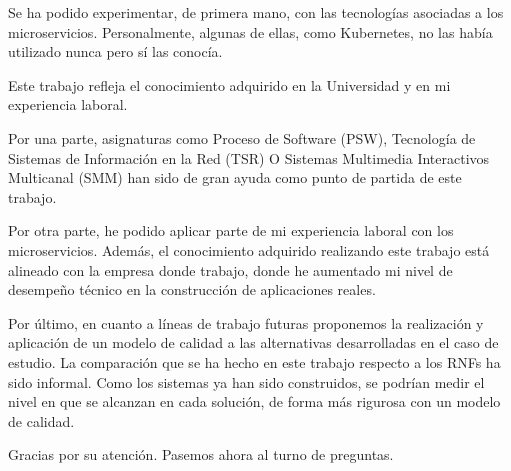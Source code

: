 \documentclass[11pt,a4paper]{article}
\begin{document}
Se ha podido experimentar, de primera mano, con las tecnologías asociadas a los microservicios. Personalmente, algunas de ellas, como Kubernetes, no las había utilizado nunca pero sí las conocía.

Este trabajo refleja el conocimiento adquirido en la Universidad y en mi experiencia laboral.

Por una parte, asignaturas como Proceso de Software (PSW), Tecnología de Sistemas de Información en la Red (TSR) O Sistemas Multimedia Interactivos Multicanal (SMM) han sido de gran ayuda como punto de partida de este trabajo.

Por otra parte, he podido aplicar parte de mi experiencia laboral con los microservicios. Además, el conocimiento adquirido realizando este trabajo está alineado con la empresa donde trabajo, donde he aumentado mi nivel de desempeño técnico en la construcción de aplicaciones reales.

Por último, en cuanto a líneas de trabajo futuras proponemos la realización y aplicación de un modelo de calidad a las alternativas desarrolladas en el caso de estudio. La comparación que se ha hecho en este trabajo respecto a los RNFs ha sido informal. Como los sistemas ya han sido construidos, se podrían medir el nivel en que se alcanzan en cada solución, de forma más rigurosa con un modelo de calidad.

Gracias por su atención. Pasemos ahora al turno de preguntas.
\end{document}
